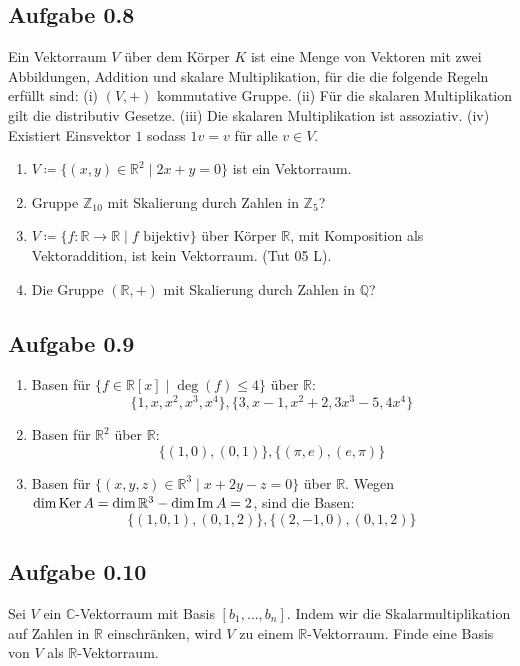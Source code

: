 \subsection*{Aufgabe 0.8}
Ein Vektorraum \(V\) über dem Körper \(K\) ist eine Menge von Vektoren
mit zwei Abbildungen, Addition und skalare Multiplikation, für die die
folgende Regeln erfüllt sind: (i) \((V, +)\) kommutative Gruppe. (ii)
Für die skalaren Multiplikation gilt die distributiv Gesetze. (iii)
Die skalaren Multiplikation ist assoziativ. (iv) Existiert Einsvektor
\(1\) sodass \(1v=v\) für alle \(v \in V\).
\begin{enumerate}
\item \(V \coloneq \{(x, y) \in \mathbb{R}^{2} \mid 2x+y=0\}\) ist ein Vektorraum.
\item Gruppe \(\mathbb{Z}_{10}\) mit Skalierung durch Zahlen in \(\mathbb{Z}_{5}\)?
\item
  \(V \coloneq \{f \colon \mathbb{R} \to \mathbb{R} \mid f \text{ bijektiv}\}\) über Körper
  \(\mathbb{R}\), mit Komposition als Vektoraddition, ist kein Vektorraum. (Tut
  05 L).
\item Die Gruppe \((\mathbb{R}, +)\) mit Skalierung durch Zahlen in \(\mathbb{Q}\)?
\end{enumerate}
\subsection*{Aufgabe 0.9}
\begin{enumerate}
\item Basen für \(\{f \in \mathbb{R}[x] \mid \deg(f) \le 4\}\) über \(\mathbb{R}\): \[\{1, x,
    x^{2}, x^{3}, x^{4}\}, \{3, x-1, x^{2}+2, 3x^{3} - 5, 4x^{4}\}\]
\item Basen für \(\mathbb{R}^{2}\) über \(\mathbb{R}\): \[\{(1, 0), (0, 1)\}, \{(\pi, e),
    (e, \pi)\}\]
\item Basen für \(\{(x, y, z) \in \mathbb{R}^{3} \mid x + 2y - z = 0\}\) über \(\mathbb{R}\).
  Wegen \(\dim \operatorname{Ker} A = \dim \mathbb{R}^{3} - \dim \operatorname{Im} A = 2\), sind die
  Basen:
  \[\{(1, 0, 1), (0, 1, 2)\}, \{(2, -1, 0), (0, 1, 2)\}\]
\end{enumerate}
\subsection*{Aufgabe 0.10}
Sei \(V\) ein \(\mathbb{C}\)-Vektorraum mit Basis \([b_{1}, \ldots, b_{n}]\).  Indem
wir die Skalarmultiplikation auf Zahlen in \(\mathbb{R}\) einschränken, wird
\(V\) zu einem \(\mathbb{R}\)-Vektorraum.  Finde eine Basis von \(V\) als
\(\mathbb{R}\)-Vektorraum.

